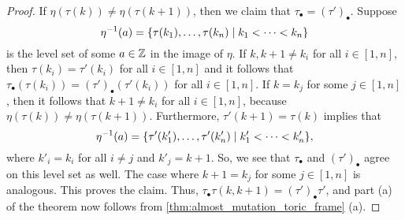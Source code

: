 \begin{proof}

	If $\eta(\tau(k)) \neq \eta(\tau(k+1))$, then we claim that $\tau_\bullet =
		(\tau')_\bullet$. Suppose
	\begin{equation*}
		\eta^{-1}(a) = \{\tau(k_1), \dots, \tau(k_n) \mid k_1 < \dots < k_n\}
	\end{equation*}
	is the level set of some $a\in \mathbb{Z}$ in the image of $\eta$. If $k, k+1 \neq k_i$ for
	all $i \in [1, n]$, then $\tau(k_i) = \tau'(k_i)$ for all $i\in [1, n]$ and it follows
	that $\tau_\bullet (\tau(k_i)) = (\tau')_\bullet (\tau'(k_i))$ for all $i\in [1, n]$.
	If $k = k_j$ for some $j \in [1, n]$, then it follows that $k+1 \neq k_i$ for all $i\in
		[1, n]$, because $\eta(\tau(k)) \neq \eta(\tau(k+1))$. Furthermore, $\tau'(k+1) =
		\tau(k)$ implies that
	\begin{equation*}
		\eta^{-1}(a) = \{\tau'(k'_1), \dots, \tau'(k'_n)
		\mid k'_1 < \cdots < k'_n\}	,
	\end{equation*}
	where $k'_i = k_i$ for all $i \neq j$ and $k'_j = k+1$. So, we see that $\tau_\bullet$
	and $(\tau')_\bullet$ agree on this level set as well. The case where $k+1 = k_j$ for
	some $j\in [1, n]$ is analogous. This proves the claim. Thus, $\tau_\bullet \tau (k,
		k+1) = (\tau')_\bullet \tau'$, and part (a) of the theorem now follows from
	\cref{thm:almost_mutation_toric_frame} (a).


\end{proof}
